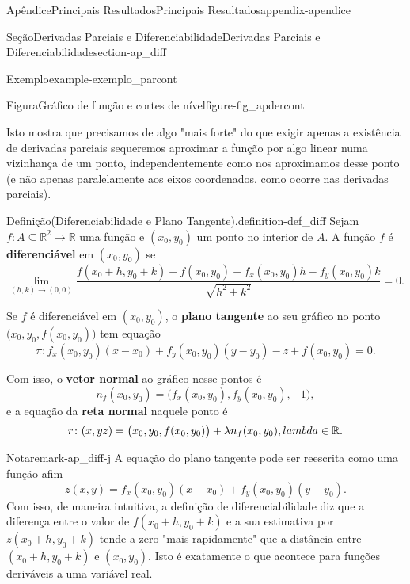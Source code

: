 \documentclass[oneside,10pt,]{book}
\newcommand{\terminology}[1]{\textbf{#1}}
\numberwithin{equation}{section}
\newcommand{\R}{\mathbb R}
\begin{document}
\begin{appendixptx}{Apêndice}{Principais Resultados}{}{Principais Resultados}{}{}{appendix-apendice}
\begin{sectionptx}{Seção}{Derivadas Parciais e Diferenciabilidade}{}{Derivadas Parciais e Diferenciabilidade}{}{}{section-ap_diff}
\begin{example}{Exemplo}{}{example-exemplo_parcont}
\begin{figureptx}{Figura}{Gráfico de função e cortes de nível}{figure-fig_apdercont}{}
\tcblower
\end{figureptx}%
%
\end{example}
Isto mostra que precisamos de algo "mais forte" do que exigir apenas a existência de derivadas parciais sequeremos aproximar a função por algo linear numa vizinhança de um ponto, independentemente como nos aproximamos desse ponto (e não apenas paralelamente aos eixos coordenados, como ocorre nas derivadas parciais).%
\begin{definition}{Definição}{(Diferenciabilidade e Plano Tangente).}{definition-def_diff}%
Sejam \(f\colon A\subseteq\R^2\to\R\) uma função e \((x_0,y_0)\) um ponto no interior de \(A\). A função \(f\) é \terminology{diferenciável} em \((x_0,y_0)\) se%
\begin{equation*}
\lim\limits_{(h,k)\to(0,0)}
\dfrac{f(x_0+h,y_0+k)-f(x_0,y_0)-f_x(x_0,y_0)h-f_y(x_0,y_0)k}
{\sqrt{h^2+k^2}}=0.
\end{equation*}
%
\par
Se \(f\) é diferenciável em \((x_0,y_0)\), o \terminology{plano tangente} ao seu gráfico no ponto \(\big(x_0,y_0,f(x_0,y_0)\big)\) tem equação%
\begin{equation*}
\pi\colon
f_x(x_0,y_0)(x-x_0)+f_y(x_0,y_0)(y-y_0)-z+f(x_0,y_0)=0.
\end{equation*}
%
\end{definition}
Com isso, o \terminology{vetor normal} ao gráfico nesse pontos é%
\begin{equation*}
n_f(x_0,y_0)=\big(f_x(x_0,y_0),f_y(x_0,y_0),-1\big),
\end{equation*}
e a equação da \terminology{reta normal} naquele ponto é%
\begin{equation*}
r\colon (x,yz)=\big(x_0,y_0,f(x_0,y_0)\big)+\lambda
n_f(x_0,y_0),\quad\\lambda\in\R.
\end{equation*}
%
\begin{remark}{Nota}{}{remark-ap_diff-j}%
A equação do plano tangente pode ser reescrita como uma função afim%
\begin{equation*}
z(x,y)=f_x(x_0,y_0)(x-x_0)+f_y(x_0,y_0)(y-y_0). 
\end{equation*}
Com isso, de maneira intuitiva, a definição de diferenciabilidade diz que a diferença entre o valor de \(f(x_0+h,y_0+k)\) e a sua estimativa por \(z(x_0+h,y_0+k)\) tende a zero "mais rapidamente" que a distância entre \((x_0+h,y_0+k)\) e \((x_0,y_0)\). Isto é exatamente o que acontece para funções deriváveis a uma variável real.\end{remark}

\end{sectionptx}
\end{appendixptx}
\end{document}
